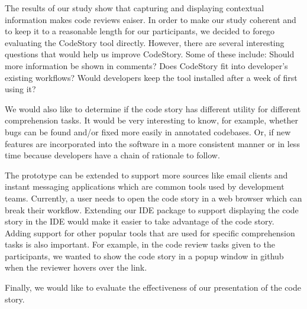 \documentclass[../manifest.tex]{subfiles}
\begin{document}
The results of our study show that capturing and displaying contextual information makes code reviews eaiser. In order to make our study coherent and to keep it to a reasonable length for our participants, we decided to forego evaluating the  CodeStory tool directly. However, there are several interesting questions that would help us improve CodeStory. Some of these include: Should more information be shown in comments? Does CodeStory fit into developer's existing workflows? Would developers keep the tool installed after a week of first using it?

We would also like to determine if the code story has different utility for different comprehension tasks. It would be very interesting to know, for example, whether bugs can be found and/or fixed more easily in annotated codebases. Or, if new features are incorporated into the software in a more consistent manner or in less time because developers have a chain of rationale to follow.

The prototype can be extended to support more sources like email clients and instant messaging applications which are common tools used by development teams. Currently, a user needs to open the code story in a web browser which can break their workflow. Extending our IDE package to support displaying the code story in the IDE would make it easier to take advantage of the code story. Adding support for other popular tools that are used for specific comprehension tasks is also important. For example, in the code review tasks given to the participants, we wanted to show the code story in a popup window in github when the reviewer hovers over the link.

Finally, we would like to evaluate the effectiveness of our presentation of the code story.
\end{document}

